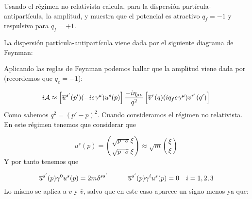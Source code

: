 \begin{ejercicio} 
	Usando el régimen no relativista calcula, para la dispersión partícula-antipartícula, la amplitud, y muestra que el potencial es atractivo $q_f=-1$ y respulsivo para $q_f=+1$.
\end{ejercicio}


\begin{solucion} 
	La dispersión partícula-antipartícula viene dada por el siguiente diagrama de Feynman:
	
	\begin{center}
	\end{center}
	Aplicando las reglas de Feynman podemos hallar que la amplitud viene dada por (recordemos que $q_e=-1$):
	
	\begin{equation*} 
		i \mathcal{A} \approx \left[  \overline{u}^{s'} (p')  (-ie\gamma^\mu) u^s (p)  \right] \frac{- i \eta_{\mu \nu}}{q^2} \left[   \overline{v}^r (q) (i q_fe\gamma^\mu)  v^{r'} (q')   \right]
	\end{equation*}
	Como sabemos $q^2 = (p'-p)^2$. Cuando consideramos el régimen no relativista. En este régimen tenemos que considerar que 
	
	\begin{equation*}
		u^s(p) = \binom{\sqrt{p \cdot \sigma} \xi }{\sqrt{p \cdot \overline{\sigma}} \xi } \approx \sqrt{m} \binom{\xi}{\xi}
	\end{equation*}
	Y por tanto tenemos que 
	
	\begin{equation*}
		\overline{u}^{s'}(p) \gamma^0 u^s(p) = 2m \delta^{ss'}  \quad \quad \quad
		\overline{u}^{s'}(p) \gamma^i u^s(p) = 0 \quad i=1,2,3
	\end{equation*}
	Lo mismo se aplica a $v$ y $\overline{v}$, salvo que en este caso aparece un signo menos ya que: 
	

\end{solucion}
